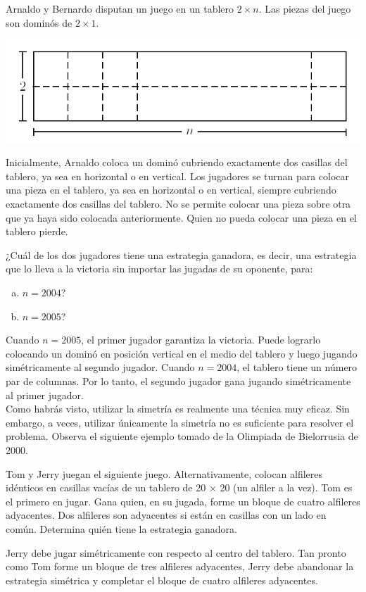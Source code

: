 \documentclass[11pt]{scrartcl}
\begin{document}
\begin{example}
Arnaldo y Bernardo disputan un juego en un tablero $2 \times n$. Las piezas del juego son dominós de $2 \times 1$.
\begin{center}
    \includegraphics[scale=0.4]{images/clase_06_eje2.png}
\end{center}
Inicialmente, Arnaldo coloca un dominó cubriendo exactamente dos casillas del tablero, ya sea en horizontal o en vertical. Los jugadores se turnan para colocar una pieza en el tablero, ya sea en horizontal o en vertical, siempre cubriendo exactamente dos casillas del tablero. No se permite colocar una pieza sobre otra que ya haya sido colocada anteriormente. Quien no pueda colocar una pieza en el tablero pierde.

¿Cuál de los dos jugadores tiene una estrategia ganadora, es decir, una estrategia que lo lleva a la victoria sin importar las jugadas de su oponente, para:
\begin{enumerate}[a)]
    \item $n = 2004$?
    \item $n = 2005$?
\end{enumerate}
\end{example}
Cuando \( n = 2005 \), el primer jugador garantiza la victoria. Puede lograrlo colocando un dominó en posición vertical en el medio del tablero y luego jugando simétricamente al segundo jugador. Cuando \( n = 2004 \), el tablero tiene un número par de columnas. Por lo tanto, el segundo jugador gana jugando simétricamente al primer jugador.\\

Como habrás visto, utilizar la simetría es realmente una técnica muy eficaz. Sin embargo, a veces, utilizar únicamente la simetría no es suficiente para resolver el problema. Observa el siguiente ejemplo tomado de la Olimpiada de Bielorrusia de 2000.

\begin{example}
Tom y Jerry juegan el siguiente juego. Alternativamente, colocan alfileres idénticos en casillas vacías de un tablero de 20 $\times$ 20 (un alfiler a la vez). Tom es el primero en jugar. Gana quien, en su jugada, forme un bloque de cuatro alfileres adyacentes. Dos alfileres son adyacentes si están en casillas con un lado en común. Determina quién tiene la estrategia ganadora.
\end{example}
Jerry debe jugar simétricamente con respecto al centro del tablero. Tan pronto como Tom forme un bloque de tres alfileres adyacentes, Jerry debe abandonar la estrategia simétrica y completar el bloque de cuatro alfileres adyacentes.
\end{document}
